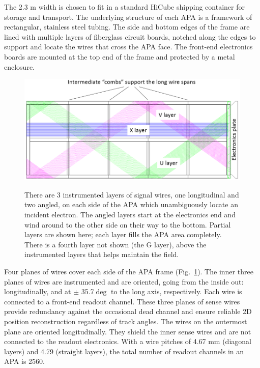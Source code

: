 The 2.3 m width is chosen to fit in a standard HiCube shipping container for storage and transport. The underlying structure of each APA is a framework of rectangular, stainless steel tubing.  The side and bottom edges of the frame are lined with multiple layers of fiberglass circuit boards, notched along the edges to support and locate the wires that cross the APA face.  The front-end electronics boards are mounted at the top end of the frame and protected by a metal enclosure.

\begin{figure}[t]
  \centering
\includegraphics[width=\linewidth]{figures/TPC_APA_2}
\label{fig:tpc_apa_wire_angle}
  \caption{There are 3 instrumented layers of signal wires, one longitudinal and two angled, on each side of the APA which unambiguously locate an incident electron.  The angled layers start at the electronics end and wind around to the other side on their way to the bottom.  Partial layers are shown here; each layer fills the APA area completely.  There is a fourth layer not shown (the G layer), above the instrumented layers that helps maintain the field.}
\end{figure}

Four planes of wires cover each side of the APA frame (Fig.~\ref{fig:tpc_apa_wire_angle}).  The inner three planes of wires are instrumented and are oriented, going from the inside out: longitudinally, and at $\pm$ 35.7$\deg$ to the long axis, respectively. Each wire is connected to a front-end readout channel. These three planes of sense wires provide redundancy against the occasional dead channel and ensure reliable 2D position reconstruction regardless of track angles. The wires on the outermost plane are oriented longitudinally. They shield the inner sense wires and are not connected to the readout electronics. With a wire pitches of 4.67 mm (diagonal layers) and 4.79 (straight layers), the total number of readout channels in an APA is 2560.


